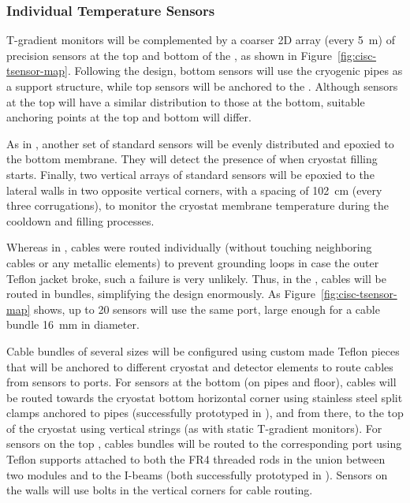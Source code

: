 \subsubsection{Individual Temperature Sensors}
\label{sec:fdgen-slow-cryo-individual-therm}

T-gradient monitors will be complemented by a coarser 2D array (every \SI{5}{m}) of precision sensors at the top and bottom of the , as shown in Figure~\ref{fig:cisc-tsensor-map}. Following the  design, bottom sensors will use the cryogenic pipes as a support structure, while top sensors will be anchored to the . Although sensors at the top will have a similar distribution to those at the bottom, %
suitable anchoring points at the top and bottom will differ. 

As in , another set of standard sensors will be evenly distributed and epoxied to the bottom membrane. They will detect the presence of \lar when cryostat filling starts. Finally, two vertical arrays of standard sensors will be epoxied to the lateral walls in two opposite vertical corners, with a spacing of \SI{102}{cm} (every three corrugations), to monitor the cryostat membrane temperature during the cooldown and filling processes. 

Whereas in , cables were routed individually (without touching neighboring cables or any metallic elements) to prevent grounding loops in case the outer Teflon jacket broke, such a failure is very unlikely. Thus, in the , cables will be routed in bundles, simplifying the design enormously. As Figure~\ref{fig:cisc-tsensor-map} shows, up to 20 sensors will use the same  port, large enough for a cable bundle \SI{16}{mm} in diameter.

Cable bundles of several sizes will be configured using custom made Teflon 
pieces %
that will be anchored to different cryostat and detector elements to route cables from sensors to  ports. For sensors at the bottom (on pipes and floor), cables will be routed towards the cryostat bottom horizontal corner using stainless steel split clamps anchored to pipes (successfully prototyped in ), and from there, to the top of the cryostat using vertical strings (as with static T-gradient monitors). For sensors on the top , cables bundles will be routed to the corresponding  port using Teflon supports attached to both the FR4 threaded rods in the union between two  modules and to the  I-beams (both successfully prototyped in ). Sensors on the walls will use bolts in the vertical corners for cable routing. 

